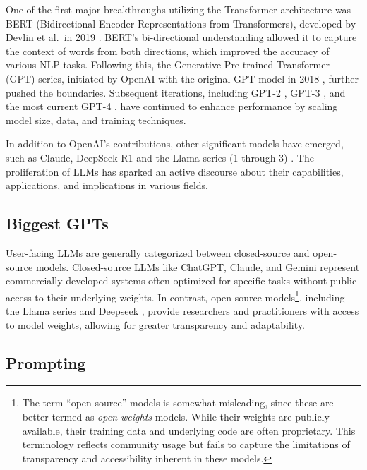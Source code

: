 \documentclass[
  a4paper,
]{scrreprt}
\theoremstyle{definition}
\theoremstyle{remark}
\begin{document}
One of the first major breakthroughs utilizing the Transformer
architecture was BERT (Bidirectional Encoder Representations from
Transformers), developed by Devlin et al.~in 2019 \autocite{devlin2019}.
BERT's bi-directional understanding allowed it to capture the context of
words from both directions, which improved the accuracy of various NLP
tasks. Following this, the Generative Pre-trained Transformer (GPT)
series, initiated by OpenAI with the original GPT model in 2018
\autocite{radford2018}, further pushed the boundaries. Subsequent
iterations, including GPT-2 \autocite{radford2019}, GPT-3
\autocite{brown2020}, and the most current GPT-4 \autocite{openai2024},
have continued to enhance performance by scaling model size, data, and
training techniques.

In addition to OpenAI's contributions, other significant models have
emerged, such as Claude, DeepSeek-R1 and the Llama series (1 through 3)
\autocite{claude,deepseek-ai2025,grattafiori2024}. The proliferation of
LLMs has sparked an active discourse about their capabilities,
applications, and implications in various fields.

\subsection{Biggest GPTs}\label{biggest-gpts}

User-facing LLMs are generally categorized between closed-source and
open-source models. Closed-source LLMs like ChatGPT, Claude, and Gemini
\autocite{chatgpt,claude,gemini} represent commercially developed
systems often optimized for specific tasks without public access to
their underlying weights. In contrast, open-source models\footnote{The
  term ``open-source'' models is somewhat misleading, since these are
  better termed as \emph{open-weights} models. While their weights are
  publicly available, their training data and underlying code are often
  proprietary. This terminology reflects community usage but fails to
  capture the limitations of transparency and accessibility inherent in
  these models.}, including the Llama series \autocite{grattafiori2024}
and Deepseek \autocite{deepseek-ai2025}, provide researchers and
practitioners with access to model weights, allowing for greater
transparency and adaptability.

\subsection{Prompting}\label{sec-prompting}
\end{document}
